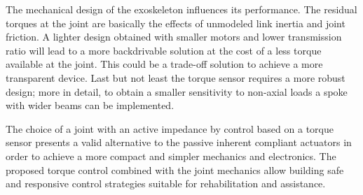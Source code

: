 \par The mechanical design of the exoskeleton influences its performance. The residual torques at the joint are basically the effects of  unmodeled link inertia and  joint friction. A  lighter design obtained with smaller motors and lower transmission ratio will lead to a more backdrivable solution at the cost of a less torque available at the joint. This could be a trade-off  solution to achieve a more transparent device. Last but not least the torque sensor requires a more robust design; more in detail, to obtain a smaller sensitivity to non-axial loads a spoke with wider beams can be implemented.
\par The choice of a joint with an active impedance by control based on a torque sensor presents a valid alternative to the passive inherent compliant actuators in order to achieve a more compact and simpler mechanics and electronics. The proposed torque control combined with the joint mechanics allow building safe and responsive control strategies suitable for rehabilitation and assistance.